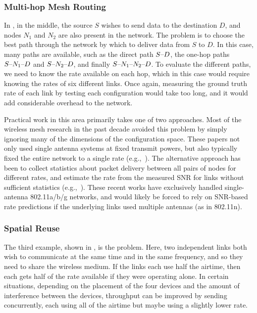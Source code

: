 \subsubsection{Multi-hop Mesh Routing}
In , in the middle, the source $S$ wishes to send data to the destination $D$, and nodes $N_1$ and $N_2$ are also present in the network. The  problem is to choose the best path through the network by which to deliver data from $S$ to $D$. In this case, many paths are available, such as the direct path $S\textnormal{--} D$, the one-hop paths $S\textnormal{--} N_1\textnormal{--} D$ and $S\textnormal{--} N_2\textnormal{--} D$, and finally $S\textnormal{--} N_1\textnormal{--} N_2\textnormal{--} D$. To evaluate the different paths, we need to know the rate available on each hop, which in this case would require knowing the rates of six different links. Once again, measuring the ground truth rate of each link by testing each configuration would take too long, and it would add considerable overhead to the network.

Practical work in this area primarily takes one of two approaches. Most of the wireless mesh research in the past decade avoided this problem by simply ignoring many of the dimensions of the configuration space. These papers not only used single antenna systems at fixed transmit powers, but also typically fixed the entire network to a single rate (e.g.,~\cite{Katti_ANC,Katti_MIXIT,Katti_XORs,Chachulski_MORE,Biswas_ExOR}). The alternative approach has been to collect statistics about packet delivery between all pairs of nodes for different rates, and estimate the rate from the measured SNR for links without sufficient statistics (e.g.,~\cite{Bahl_repeater}). These recent works have exclusively handled single-antenna 802.11a/b/g networks, and would likely be forced to rely on SNR-based rate predictions if the underlying links used multiple antennas (as in 802.11n).

\subsubsection{Spatial Reuse}
The third example, shown in , is the  problem. Here, two independent links both wish to communicate at the same time and in the same frequency, and so they need to share the wireless medium. If the links each use half the airtime, then each gets half of the rate available if they were operating alone. In certain situations, depending on the placement of the four devices and the amount of interference between the devices, throughput can be improved by sending concurrently, each using all of the airtime but maybe using a slightly lower rate.

